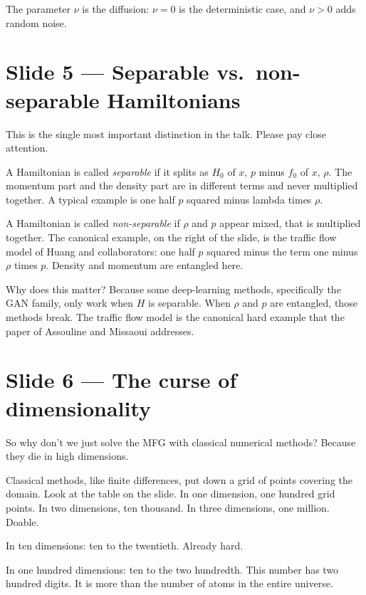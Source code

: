 \documentclass[11pt]{article}
\begin{document}
The parameter $\nu$ is the diffusion: $\nu = 0$ is the deterministic
case, and $\nu > 0$ adds random noise.

\section*{Slide 5 --- Separable vs.\ non-separable Hamiltonians}

This is the single most important distinction in the talk.  Please pay
close attention.

A Hamiltonian is called \emph{separable} if it splits as $H_0$ of $x$, $p$
minus $f_0$ of $x$, $\rho$.  The momentum part and the density part are
in different terms and never multiplied together.  A typical example is
one half $p$ squared minus lambda times $\rho$.

A Hamiltonian is called \emph{non-separable} if $\rho$ and $p$ appear
mixed, that is multiplied together.  The canonical example, on the right
of the slide, is the traffic flow model of Huang and collaborators:
one half $p$ squared minus the term one minus $\rho$ times $p$.  Density
and momentum are entangled here.

Why does this matter?  Because some deep-learning methods, specifically
the GAN family, only work when $H$ is separable.  When $\rho$ and $p$ are
entangled, those methods break.  The traffic flow model is the canonical
hard example that the paper of Assouline and Missaoui addresses.

\section*{Slide 6 --- The curse of dimensionality}

So why don't we just solve the MFG with classical numerical methods?
Because they die in high dimensions.

Classical methods, like finite differences, put down a grid of points
covering the domain.  Look at the table on the slide.  In one dimension,
one hundred grid points.  In two dimensions, ten thousand.  In three
dimensions, one million.  Doable.

In ten dimensions: ten to the twentieth.  Already hard.

In one hundred dimensions: ten to the two hundredth.  This number has
two hundred digits.  It is more than the number of atoms in the entire
universe.
\end{document}
